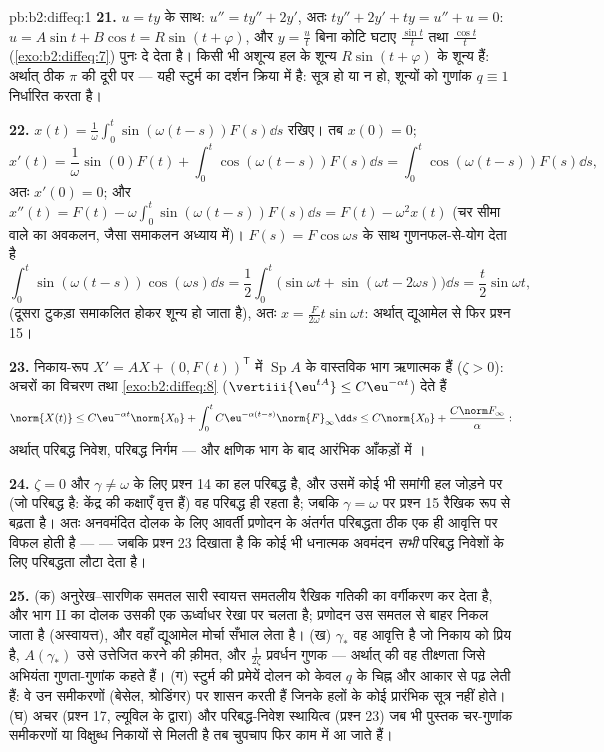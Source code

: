 \begin{solution}{pb:b2:diffeq:1}
\textbf{21.} $u = ty$ के साथ: $u'' = ty'' + 2y'$, अतः $ty'' + 2y'
+ ty = u'' + u = 0$: $u = A\sin t + B\cos t = R\sin(t +
\varphi)$, और $y = \frac{u}{t}$ बिना कोटि घटाए $\frac{\sin t}t$
तथा $\frac{\cos t}t$ (\cref{exo:b2:diffeq:7}) पुनः दे देता है। किसी भी अशून्य हल के शून्य $R\sin(t + \varphi)$ के शून्य
हैं: अर्थात् ठीक $\pi$ की दूरी पर --- यही स्टुर्म का दर्शन क्रिया में है:
सूत्र हो या न हो, शून्यों को गुणांक $q \equiv 1$ निर्धारित करता है।

\textbf{22.} $x(t) =
\frac1\omega\int_0^t\sin(\omega(t-s))F(s)\dd s$ रखिए। तब $x(0) =
0$;
\[
x'(t) = \frac1\omega\sin(0)F(t) +
\int_0^t\cos(\omega(t-s))F(s)\dd s
= \int_0^t\cos(\omega(t-s))F(s)\dd s ,
\]
अतः $x'(0) = 0$; और $x''(t) = F(t) -
\omega\int_0^t\sin(\omega(t-s))F(s)\dd s = F(t) - \omega^2x(t)$ (चर सीमा वाले  का अवकलन, जैसा समाकलन अध्याय
में)। $F(s) = F\cos\omega s$ के साथ गुणनफल-से-योग देता है
\[
\int_0^t\sin(\omega(t-s))\cos(\omega s)\dd s
= \frac12\int_0^t\bigl(\sin\omega t + \sin(\omega t -
2\omega s)\bigr)\dd s
= \frac{t}{2}\sin\omega t ,
\]
(दूसरा टुकड़ा समाकलित होकर शून्य हो जाता है), अतः $x =
\frac{F}{2\omega}t\sin\omega t$: अर्थात् द्यूआमेल से
फिर प्रश्न 15।

\textbf{23.} निकाय-रूप $X' = AX + (0, F(t))^{\mathsf T}$ में $\operatorname{Sp}A$ के वास्तविक भाग ऋणात्मक हैं ($\zeta >
0$):
अचरों का विचरण तथा \cref{exo:b2:diffeq:8} ($\vertiii{\eu^{tA}} \leq C\eu^{-\alpha t}$) देते हैं
\[
\norm{X(t)} \leq C\eu^{-\alpha t}\norm{X_0}
+ \int_0^t C\eu^{-\alpha(t-s)}\norm{F}_\infty\dd s
\leq C\norm{X_0} + \frac{C\norm F_\infty}{\alpha} :
\]
अर्थात् परिबद्ध निवेश, परिबद्ध निर्गम --- और क्षणिक भाग के बाद आरंभिक
आँकड़ों में ।

\textbf{24.} $\zeta = 0$ और $\gamma \neq \omega$ के लिए प्रश्न 14 का हल परिबद्ध है, और उसमें कोई
भी समांगी हल जोड़ने पर (जो परिबद्ध है: केंद्र की कक्षाएँ वृत्त हैं) वह
परिबद्ध ही रहता है; जबकि $\gamma = \omega$ पर प्रश्न 15 रैखिक रूप से बढ़ता है। अतः
अनवमंदित दोलक के लिए आवर्ती प्रणोदन के अंतर्गत परिबद्धता ठीक एक ही आवृत्ति
पर विफल होती है ---  --- जबकि प्रश्न 23 दिखाता है कि कोई भी धनात्मक
अवमंदन \emph{सभी} परिबद्ध निवेशों के लिए परिबद्धता लौटा देता है।

\textbf{25.} (क) अनुरेख--सारणिक समतल सारी स्वायत्त समतलीय रैखिक गतिकी का
वर्गीकरण कर देता है, और भाग II का दोलक उसकी एक ऊर्ध्वाधर रेखा पर चलता है;
प्रणोदन उस समतल से बाहर निकल जाता है (अस्वायत्त), और वहाँ द्यूआमेल मोर्चा
सँभाल लेता है। (ख) $\gamma_*$ वह आवृत्ति है जो निकाय को प्रिय है, $A(\gamma_*)$ उसे उत्तेजित
करने की क़ीमत, और $\frac{1}{2\zeta}$ प्रवर्धन गुणक --- अर्थात्  की वह तीक्ष्णता
जिसे अभियंता गुणता-गुणांक कहते हैं। (ग) स्टुर्म की प्रमेयें दोलन को केवल
$q$ के चिह्न और आकार से पढ़ लेती हैं: वे उन समीकरणों (बेसेल, श्रोडिंगर) पर
शासन करती हैं जिनके हलों के कोई प्रारंभिक सूत्र नहीं होते। (घ) अचर
 (प्रश्न 17, ल्यूविल के द्वारा) और परिबद्ध-निवेश स्थायित्व
(प्रश्न 23) जब भी पुस्तक चर-गुणांक समीकरणों या विक्षुब्ध निकायों से मिलती
है तब चुपचाप फिर काम में आ जाते हैं।
\end{solution}
